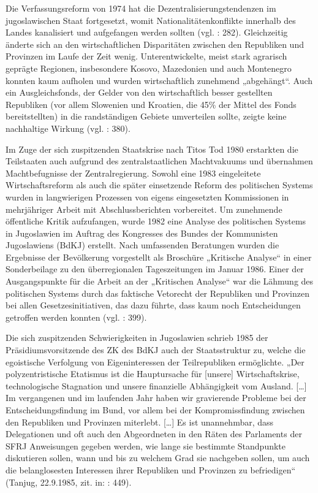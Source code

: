 Die Verfassungsreform von 1974 hat die Dezentralisierungstendenzen im jugoslawischen Staat fortgesetzt, womit Nationalitätenkonflikte innerhalb des Landes kanalisiert und aufgefangen werden sollten (vgl. \cite{roggemann}: 282). Gleichzeitig änderte sich an den wirtschaftlichen Disparitäten zwischen den Republiken und Provinzen im Laufe der Zeit wenig. Unterentwickelte, meist stark agrarisch geprägte Regionen, insbesondere Kosovo, Mazedonien und auch Montenegro konnten kaum aufholen und wurden wirtschaftlich zunehmend „abgehängt“. Auch ein Ausgleichsfonds, der Gelder von den wirtschaftlich besser gestellten Republiken (vor allem Slowenien und Kroatien, die 45\% der Mittel des Fonds bereitstellten) in die randständigen Gebiete umverteilen sollte, zeigte keine nachhaltige Wirkung (vgl. \cite{ramet}: 380).\par
Im Zuge der sich zuspitzenden Staatskrise nach Titos Tod 1980 erstarkten die Teilstaaten auch aufgrund des zentralstaatlichen Machtvakuums und übernahmen Machtbefugnisse der Zentralregierung. Sowohl eine 1983 eingeleitete Wirtschaftsreform als auch die später einsetzende Reform des politischen Systems wurden in langwierigen Prozessen von eigens eingesetzten Kommissionen in mehrjähriger Arbeit mit Abschlussberichten vorbereitet. Um zunehmende öffentliche Kritik aufzufangen, wurde 1982 eine Analyse des politischen Systems in Jugoslawien im Auftrag des Kongresses des Bundes der Kommunisten Jugoslawiens (BdKJ) erstellt. Nach umfassenden Beratungen wurden die Ergebnisse der Bevölkerung vorgestellt als Broschüre „Kritische Analyse“ in einer Sonderbeilage zu den überregionalen Tageszeitungen im Januar 1986. Einer der Ausgangspunkte für die Arbeit an der „Kritischen Analyse“ war die Lähmung des politischen Systems durch das faktische Vetorecht der Republiken und Provinzen bei allen Gesetzesinitiativen, das dazu führte, dass kaum noch Entscheidungen getroffen werden konnten (vgl. \cite{reuter}: 399).\par
Die sich zuspitzenden Schwierigkeiten in Jugoslawien schrieb 1985 der Präsidiumsvorsitzende des ZK des BdKJ auch der Staatsstruktur zu, welche die egoistische Verfolgung von Eigeninteressen der Teilrepubliken ermöglichte. „Der polyzentristische Etatismus ist die Hauptursache für [unsere] Wirtschaftskrise, technologische Stagnation und unsere finanzielle Abhängigkeit vom Ausland. […] Im vergangenen und im laufenden Jahr haben wir gravierende Probleme bei der Entscheidungsfindung im Bund, vor allem bei der Kompromissfindung zwischen den Republiken und Provinzen miterlebt. […] Es ist unannehmbar, dass Delegationen und oft auch den Abgeordneten in den Räten des Parlaments der SFRJ Anweisungen gegeben werden, wie lange sie bestimmte Standpunkte diskutieren sollen, wann und bis zu welchem Grad sie nachgeben sollen, um auch die belanglosesten Interessen ihrer Republiken und Provinzen zu befriedigen“ (Tanjug, 22.9.1985, zit. in:  \cite{ramet}: 449).\par
